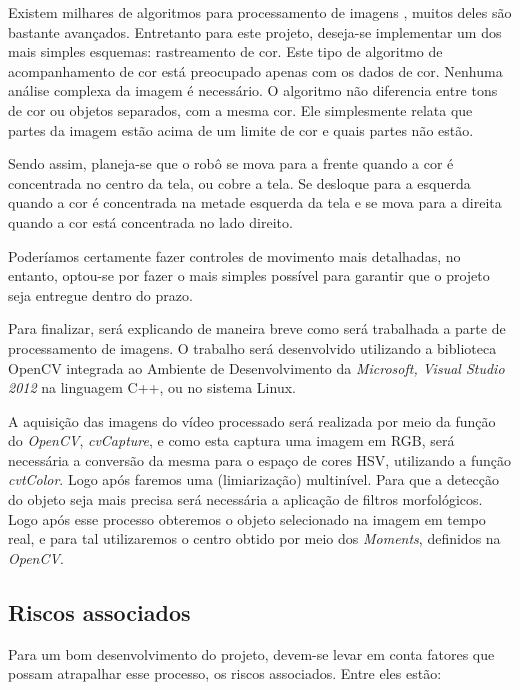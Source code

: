     Existem milhares de algoritmos para processamento de imagens , muitos deles são bastante avançados. Entretanto para este projeto, deseja-se implementar um dos mais simples esquemas: rastreamento de cor. Este tipo de algoritmo de acompanhamento de cor está preocupado apenas com os dados de cor. Nenhuma análise complexa da imagem é necessário. O algoritmo não diferencia entre tons de cor ou objetos separados, com a mesma cor. Ele simplesmente relata que partes da imagem estão acima de um limite de cor e quais partes não estão.
	
    Sendo assim, planeja-se que o robô se mova para a frente quando a cor é concentrada no centro da tela, ou cobre a tela. Se desloque para a esquerda quando a cor é concentrada na metade esquerda da tela e se mova para a direita quando a cor está concentrada no lado direito. 
	
    Poderíamos certamente fazer controles de movimento mais detalhadas, no entanto, optou-se por fazer o mais simples possível para garantir que o projeto seja entregue dentro do prazo. 
	
    Para finalizar, será explicando de maneira breve como será trabalhada a parte de processamento de imagens. O trabalho será desenvolvido utilizando a biblioteca OpenCV integrada ao Ambiente de Desenvolvimento da \textit{Microsoft, Visual Studio 2012} na linguagem C++, ou no sistema Linux. 
	
   A aquisição das imagens do vídeo processado será realizada por meio da função do \textit{OpenCV}, \textit{cvCapture}, e como esta captura uma imagem em RGB, será necessária a conversão da mesma para o espaço de cores HSV, utilizando a função \textit{cvtColor}. Logo após faremos uma (limiarização) multinível. Para que a detecção do objeto seja mais precisa será necessária a aplicação de filtros morfológicos. Logo após esse processo obteremos o objeto selecionado na imagem em tempo real, e para tal utilizaremos o centro obtido por meio dos \textit{Moments}, definidos na \textit{OpenCV}.
 
\subsection{Riscos associados}

Para um bom desenvolvimento do projeto, devem-se levar em conta fatores que possam atrapalhar esse processo, os  riscos associados. Entre eles estão:

